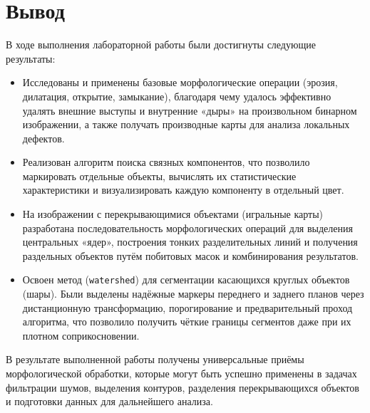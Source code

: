 \documentclass[a4paper,12pt]{article}
\begin{document}
\section{Вывод}
В ходе выполнения лабораторной работы были достигнуты следующие результаты:
\begin{itemize}
  \item Исследованы и применены базовые морфологические операции (эрозия, дилатация, открытие, замыкание), благодаря чему удалось эффективно удалять внешние выступы и внутренние «дыры» на произвольном бинарном изображении, а также получать производные карты для анализа локальных дефектов.
  \item Реализован алгоритм поиска связных компонентов, что позволило маркировать отдельные объекты, вычислять их статистические характеристики и визуализировать каждую компоненту в отдельный цвет.
  \item На изображении с перекрывающимися объектами (игральные карты) разработана последовательность морфологических операций для выделения центральных «ядер», построения тонких разделительных линий и получения раздельных объектов путём побитовых масок и комбинирования результатов.
  \item Освоен метод (\texttt{watershed}) для сегментации касающихся круглых объектов (шары). Были выделены надёжные маркеры переднего и заднего планов через дистанционную трансформацию, порогирование и предварительный проход алгоритма, что позволило получить чёткие границы сегментов даже при их плотном соприкосновении.
\end{itemize}

В результате выполненной работы получены универсальные приёмы морфологической обработки, которые могут быть успешно применены в задачах фильтрации шумов, выделения контуров, разделения перекрывающихся объектов и подготовки данных для дальнейшего анализа.
\end{document}

